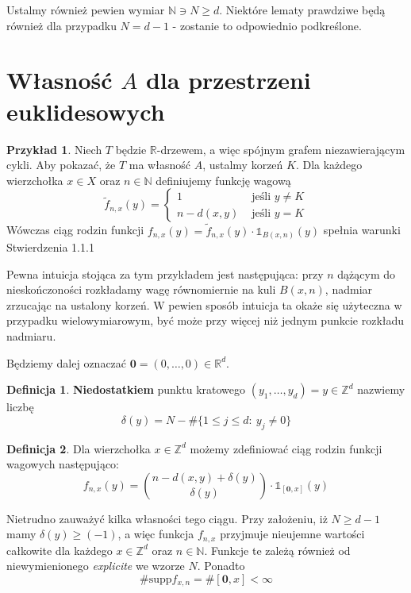\documentclass[licencjacka]{pracamgr}
\theoremstyle{definition}
\newtheorem{definition}{Definicja}[section]
\theoremstyle{definition}
\theoremstyle{definition}
\theoremstyle{definition}
\newtheorem{example}{Przykład}[section]
\theoremstyle{definition}
\theoremstyle{plain}
\theoremstyle{plain}
\begin{document}
Ustalmy również pewien wymiar $\mathbb{N} \ni N \geq d $. 
Niektóre lematy prawdziwe będą również dla przypadku $ N = d-1$ - zostanie to odpowiednio 
podkreślone.

\section{Własność $ A $ dla przestrzeni euklidesowych}

\begin{example}
	Niech $ T $ będzie $ \mathbb{R} $-drzewem, a więc spójnym grafem niezawierającym cykli. 
	Aby pokazać, że $ T $ ma własność $ A $, ustalmy korzeń $ K $. Dla każdego wierzchołka 
	$ x \in X $ oraz $ n \in\mathbb{N} $ definiujemy funkcję wagową
	$$ \tilde f_{n,x}(y) = 
	\begin{cases}
		1 & \text{ jeśli } y \neq K \\
		n - d(x,y) & \text{ jeśli } y = K
	\end{cases} $$
	Wówczas ciąg rodzin funkcji $ f_{n,x}(y) = \tilde f_{n,x}(y) \cdot \mathbb{1}_{B
	(x, n)} (y) $ spełnia warunki Stwierdzenia 1.1.1
\end{example}

Pewna intuicja stojąca za tym przykładem jest następująca: przy $ n $ dążącym do 
nieskończoności rozkładamy wagę równomiernie na kuli $ B(x,n) $, nadmiar zrzucając na 
ustalony korzeń. W pewien sposób intuicja ta okaże się użyteczna w przypadku 
wielowymiarowym, być może przy więcej niż jednym punkcie rozkładu nadmiaru. 

Będziemy dalej oznaczać $ \textbf{0} = (0, \dots, 0) \in \mathbb{R}^d $.

\begin{definition}
	\textbf{Niedostatkiem} punktu kratowego $ (y_1, \dots, y_d) = y \in \mathbb{Z}^d $ 
	nazwiemy liczbę 
	$$ \delta(y) = N - \# \{1 \leq j \leq d: ~ y_j \neq 0 \} $$
\end{definition}

\begin{definition}
	Dla wierzchołka $ x \in \mathbb{Z}^d $ możemy zdefiniować ciąg rodzin funkcji wagowych 
	następująco:
	$$ f_{n,x}(y) = {n - d(x,y) + \delta(y) \choose \delta(y)} \cdot 
	\mathbb{1}_{[\textbf{0},x]} (y)$$
\end{definition}

Nietrudno zauważyć kilka własności tego ciągu. Przy założeniu, iż $ N \geq d - 1 $ mamy 
$ \delta(y) \geq (-1) $, a więc funkcja $ f_{n,x} $ przyjmuje nieujemne wartości 
całkowite dla każdego $ x \in \mathbb{Z}^d $ oraz $ n \in \mathbb{N} $. Funkcje te 
zależą również od niewymienionego \textit{explicite} we wzorze $ N $. Ponadto 
$$ \# \text{supp}f_{x,n} = \# [\textbf{0}, x] < \infty $$
\end{document}
